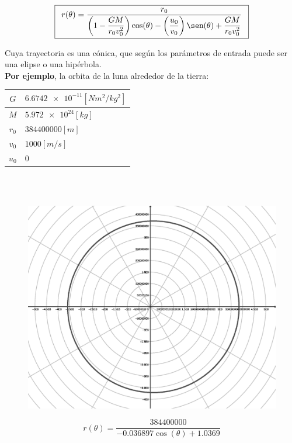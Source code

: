 \documentclass[letter,11pt]{article}
\begin{document}
\begin{equation*}
\boxed{\begin{array}{l}
    r(\theta)=\dfrac{r_0}{\left(
        1-\dfrac{GM}{r_0v^2_0}
    \right)\cos(\theta)-\left(
        \dfrac{u_0}{v_0}
    \right)\sen(\theta)+\dfrac{GM}{r_0v^2_0}}
\end{array}}
\label{ec01}
\end{equation*}

Cuya trayectoria es una cónica, que según los parámetros de entrada puede ser
una elipse o una hipérbola.
\\

\textbf{Por ejemplo}, la orbita de la luna alrededor de la tierra:
\\

\begin{tabular}{|c|>{\centering}m{5.0cm}<{\centering}|}
\hline
$G$   & $\num{6.6742e-11}[Nm^2/kg^2]$ \tabularnewline \hline
$M$   & $\num{5.972e24}[kg]$          \tabularnewline \hline
$r_0$ & $384400000[m]$                \tabularnewline \hline
$v_0$ & $1000[m/s]$                   \tabularnewline \hline
$u_0$ & $0$                           \tabularnewline \hline
\end{tabular}
\\
\\

\begin{figure}[!h]
\centering
\includegraphics[scale=0.5]{resources/tarea_02.eps}
\end{figure}
\begin{equation*}
    r(\theta)=\dfrac{384400000}{-0.036897\cos(\theta)+1.0369}
\end{equation*}
\end{document}

